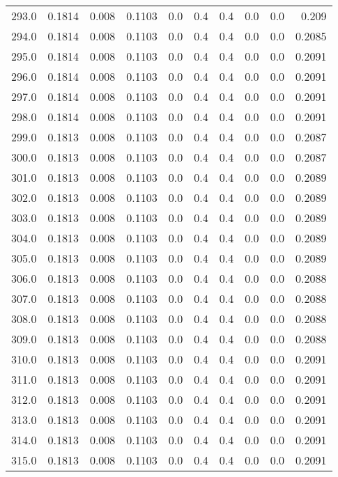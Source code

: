 \begin{longtable}{lrrrrrrrrr}
293.0 & 0.1814 & 0.008 & 0.1103 & 0.0 & 0.4 & 0.4 & 0.0 & 0.0 & 0.209 \\
294.0 & 0.1814 & 0.008 & 0.1103 & 0.0 & 0.4 & 0.4 & 0.0 & 0.0 & 0.2085 \\
295.0 & 0.1814 & 0.008 & 0.1103 & 0.0 & 0.4 & 0.4 & 0.0 & 0.0 & 0.2091 \\
296.0 & 0.1814 & 0.008 & 0.1103 & 0.0 & 0.4 & 0.4 & 0.0 & 0.0 & 0.2091 \\
297.0 & 0.1814 & 0.008 & 0.1103 & 0.0 & 0.4 & 0.4 & 0.0 & 0.0 & 0.2091 \\
298.0 & 0.1814 & 0.008 & 0.1103 & 0.0 & 0.4 & 0.4 & 0.0 & 0.0 & 0.2091 \\
299.0 & 0.1813 & 0.008 & 0.1103 & 0.0 & 0.4 & 0.4 & 0.0 & 0.0 & 0.2087 \\
300.0 & 0.1813 & 0.008 & 0.1103 & 0.0 & 0.4 & 0.4 & 0.0 & 0.0 & 0.2087 \\
301.0 & 0.1813 & 0.008 & 0.1103 & 0.0 & 0.4 & 0.4 & 0.0 & 0.0 & 0.2089 \\
302.0 & 0.1813 & 0.008 & 0.1103 & 0.0 & 0.4 & 0.4 & 0.0 & 0.0 & 0.2089 \\
303.0 & 0.1813 & 0.008 & 0.1103 & 0.0 & 0.4 & 0.4 & 0.0 & 0.0 & 0.2089 \\
304.0 & 0.1813 & 0.008 & 0.1103 & 0.0 & 0.4 & 0.4 & 0.0 & 0.0 & 0.2089 \\
305.0 & 0.1813 & 0.008 & 0.1103 & 0.0 & 0.4 & 0.4 & 0.0 & 0.0 & 0.2089 \\
306.0 & 0.1813 & 0.008 & 0.1103 & 0.0 & 0.4 & 0.4 & 0.0 & 0.0 & 0.2088 \\
307.0 & 0.1813 & 0.008 & 0.1103 & 0.0 & 0.4 & 0.4 & 0.0 & 0.0 & 0.2088 \\
308.0 & 0.1813 & 0.008 & 0.1103 & 0.0 & 0.4 & 0.4 & 0.0 & 0.0 & 0.2088 \\
309.0 & 0.1813 & 0.008 & 0.1103 & 0.0 & 0.4 & 0.4 & 0.0 & 0.0 & 0.2088 \\
310.0 & 0.1813 & 0.008 & 0.1103 & 0.0 & 0.4 & 0.4 & 0.0 & 0.0 & 0.2091 \\
311.0 & 0.1813 & 0.008 & 0.1103 & 0.0 & 0.4 & 0.4 & 0.0 & 0.0 & 0.2091 \\
312.0 & 0.1813 & 0.008 & 0.1103 & 0.0 & 0.4 & 0.4 & 0.0 & 0.0 & 0.2091 \\
313.0 & 0.1813 & 0.008 & 0.1103 & 0.0 & 0.4 & 0.4 & 0.0 & 0.0 & 0.2091 \\
314.0 & 0.1813 & 0.008 & 0.1103 & 0.0 & 0.4 & 0.4 & 0.0 & 0.0 & 0.2091 \\
315.0 & 0.1813 & 0.008 & 0.1103 & 0.0 & 0.4 & 0.4 & 0.0 & 0.0 & 0.2091 \\

\end{longtable}
